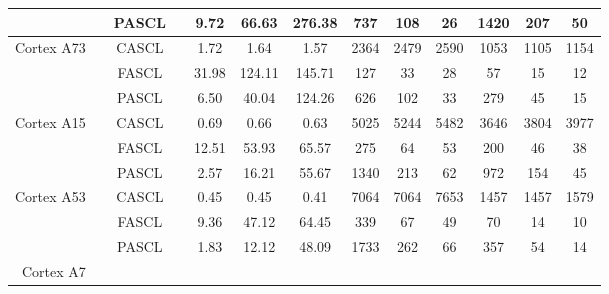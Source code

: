 \begin{table}[t]
{{\begin{tabular}{r|c|c|c c c c| c c c| c c c}
      & & PASCL &                         &   9.72  & 66.63  & 276.38 & 737   & 108  & 26   & 1420 & 207  & 50   \\
      \hline
      \multirow{3}{*}{\begin{minipage}{0.5in}\centering Cortex A73\end{minipage}} & \multirow{3}{*}{\begin{minipage}{0.5in}\centering 2360\end{minipage}} 
        & CASCL &                         & 1.72  & 1.64   & 1.57     & 2364  & 2479 & 2590 & 1053 & 1105 & 1154  \\
      & & FASCL &                         & 31.98 & 124.11 & 145.71   & 127   & 33   & 28   & 57   & 15   & 12    \\
      & & PASCL &                         & 6.50  & 40.04  & 124.26   & 626   & 102  & 33   & 279  & 45   & 15    \\
      \hline
      \multirow{3}{*}{\begin{minipage}{0.5in}\centering Cortex A15\end{minipage}} & \multirow{3}{*}{\begin{minipage}{0.5in}\centering 2000\end{minipage}} 
        & CASCL &                         & 0.69  & 0.66  & 0.63     & 5025  & 5244 & 5482 & 3646 & 3804 & 3977   \\
      & & FASCL &                         & 12.51 & 53.93 & 65.57    & 275   & 64   & 53   & 200  & 46   & 38     \\
      & & PASCL &                         & 2.57  & 16.21 & 55.67    & 1340  & 213  & 62   & 972  & 154  & 45     \\
      \hline
      \multirow{3}{*}{\begin{minipage}{0.5in}\centering Cortex A53\end{minipage}} & \multirow{3}{*}{\begin{minipage}{0.5in}\centering 1840\end{minipage}} 
        & CASCL &                         & 0.45 & 0.45  & 0.41      & 7064 & 7064 & 7653 & 1457 & 1457 & 1579     \\
      & & FASCL &                         & 9.36 & 47.12 & 64.45     & 339  & 67   & 49   & 70   & 14   & 10       \\
      & & PASCL &                         & 1.83 & 12.12 & 48.09     & 1733 & 262  & 66   & 357  & 54   & 14       \\
      \hline
      \multirow{3}{*}{\begin{minipage}{0.5in}\centering Cortex A7\end{minipage}} & \multirow{3}{*}{\begin{minipage}{0.5in}\centering 1400\end{minipage}} 

\end{tabular}}}
\end{table}
